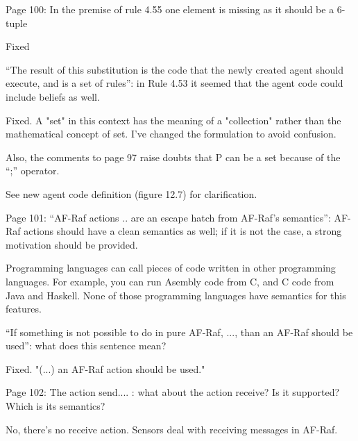 \documentclass{article}
\newenvironment{them}{\noindent\begingroup\color{blue}}{\endgroup\par}
\begin{document}
\begin{them}

Page 100:
In the premise of rule 4.55 one element is missing as it should be a 6-tuple
\end{them}
Fixed

\begin{them}

“The result of this substitution is the code that the newly created agent
should execute, and is a set of rules”: in Rule 4.53 it seemed that the agent
code could include beliefs as well.

\end{them}
Fixed. A "set" in this context has the meaning of a "collection" rather than
the mathematical concept of set. I've changed the formulation to avoid
confusion.

\begin{them}

Also, the comments to page 97 raise doubts that P can be a set because of the
“;” operator.

\end{them}
See new agent code definition (figure 12.7) for clarification.

\begin{them}

Page 101:
“AF-Raf actions .. are an escape hatch from AF-Raf's semantics”: AF-Raf actions
should have a clean semantics as well; if it is not the case, a strong
motivation should be provided.

\end{them}
Programming languages can call pieces of code written in other programming
languages. For example, you can run Asembly code from C, and C code from Java
and Haskell. None of those programming languages have semantics for this
features.

\begin{them}

“If something is not possible to do in pure AF-Raf, ..., than an AF-Raf should
be used”: what does this sentence mean?

\end{them}
Fixed. "(...) an AF-Raf action should be used."

\begin{them}

Page 102:
The action send.... : what about the action receive? Is it supported? Which is
its semantics?

\end{them}
No, there's no receive action. Sensors deal with receiving messages in AF-Raf.
\end{document}
